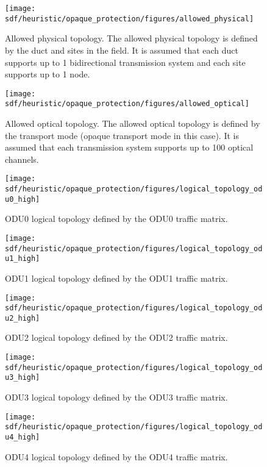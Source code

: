 \begin{figure}[H]
\centering
\texttt{[image: sdf/heuristic/opaque\_protection/figures/allowed\_physical]}
\caption{Allowed physical topology. The allowed physical topology is defined by the duct and sites in the field. It is assumed that each duct supports up to 1 bidirectional transmission system and each site supports up to 1 node.}
\label{allowed_physical_protec_ref_high_heuristic}
\end{figure}

\begin{figure}[H]
\centering
\texttt{[image: sdf/heuristic/opaque\_protection/figures/allowed\_optical]}
\caption{Allowed optical topology. The allowed optical topology is defined by the transport mode (opaque transport mode in this case). It is assumed that each transmission system supports up to 100 optical channels.}
\label{allowed_optical_protec_ref_high_heuristic}
\end{figure}

\begin{figure}[H]
\centering
\texttt{[image: sdf/heuristic/opaque\_protection/figures/logical\_topology\_odu0\_high]}
\caption{ODU0 logical topology defined by the ODU0 traffic matrix.}
\label{logical_ODU0_protec_ref_high_heuristic}
\end{figure}

\begin{figure}[H]
\centering
\texttt{[image: sdf/heuristic/opaque\_protection/figures/logical\_topology\_odu1\_high]}
\caption{ODU1 logical topology defined by the ODU1 traffic matrix.}
\label{logical_ODU1_protec_ref_high_heuristic}
\end{figure}

\begin{figure}[H]
\centering
\texttt{[image: sdf/heuristic/opaque\_protection/figures/logical\_topology\_odu2\_high]}
\caption{ODU2 logical topology defined by the ODU2 traffic matrix.}
\label{logical_ODU2_protec_ref_high_heuristic}
\end{figure}

\begin{figure}[H]
\centering
\texttt{[image: sdf/heuristic/opaque\_protection/figures/logical\_topology\_odu3\_high]}
\caption{ODU3 logical topology defined by the ODU3 traffic matrix.}
\label{logical_ODU3_protec_ref_high_heuristic}
\end{figure}

\begin{figure}[H]
\centering
\texttt{[image: sdf/heuristic/opaque\_protection/figures/logical\_topology\_odu4\_high]}
\caption{ODU4 logical topology defined by the ODU4 traffic matrix.}
\label{logical_ODU4_protec_ref_high_heuristic}
\end{figure}

